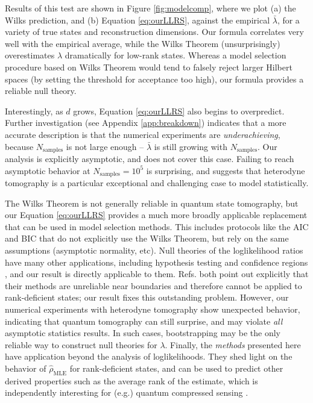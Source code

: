 \documentclass[aps,pra, twocolumn]{revtex4}
\newcommand{\rhohat}{\hat{\rho}}
\newcommand{\rhoMLE}{\rhohat_{\scriptscriptstyle\mathrm{MLE}}}
\begin{document}
Results of this test are shown in Figure \ref{fig:modelcomp}, where we plot (a) the Wilks prediction, and (b) Equation \eqref{eq:ourLLRS}, against the empirical $\bar\lambda$, for a variety of true states and reconstruction dimensions.  Our formula correlates very well with the empirical average, while the Wilks Theorem (unsurprisingly) overestimates $\lambda$ dramatically for low-rank states.  Whereas a model selection procedure based on Wilks Theorem would tend to falsely reject larger Hilbert spaces (by setting the threshold for acceptance too high), our formula provides a reliable null theory.

Interestingly, as $d$ grows, Equation \eqref{eq:ourLLRS} also begins to overpredict.  Further investigation (see Appendix \ref{app:breakdown}) indicates that a more accurate description is that the numerical experiments are \emph{underachieving}, because $N_{\mathrm{samples}}$ is not large enough -- $\bar\lambda$ is still growing with $N_{\mathrm{samples}}$.  Our analysis is explicitly asymptotic, and does not cover this case.  Failing to reach asymptotic behavior at $N_{\mathrm{samples}}=10^5$ is surprising, and suggests that heterodyne tomography is a particular exceptional and challenging case to model statistically.

The Wilks Theorem is not generally reliable in quantum state tomography, but our Equation \eqref{eq:ourLLRS} provides a much more broadly applicable replacement that can be used in model selection methods.  This includes protocols like the AIC and BIC \cite{Akaike1974, Schwarz1978, Burnham2004} that do not explicitly use the Wilks Theorem, but rely on the same assumptions (asymptotic normality, etc).  Null theories of the loglikelihood ratios have many other applications, including hypothesis testing \cite{Blume-Kohout2010,Moroder2013} and confidence regions \cite{Glancy2012a}, and our result is directly applicable to them.  Refs. \cite{Moroder2013,Glancy2012a} both point out explicitly that their methods are unreliable near boundaries and therefore cannot be applied to rank-deficient states; our result fixes this outstanding problem.  However, our numerical experiments with heterodyne tomography show unexpected behavior, indicating that quantum tomography can still surprise, and may violate \emph{all} asymptotic statistics results.  In such cases, bootstrapping \cite{Efron1979} may be the only reliable way to construct null theories for $\lambda$.  Finally, the \emph{methods} presented here have application beyond the analysis of loglikelihoods.  They shed light on the behavior of $\rhoMLE$ for rank-deficient states, and can be used to predict other derived properties such as the average rank of the estimate, which is independently interesting for (e.g.) quantum compressed sensing \cite{Flammia2012a, Kalev2015, Kalev2015a}.
\end{document}
